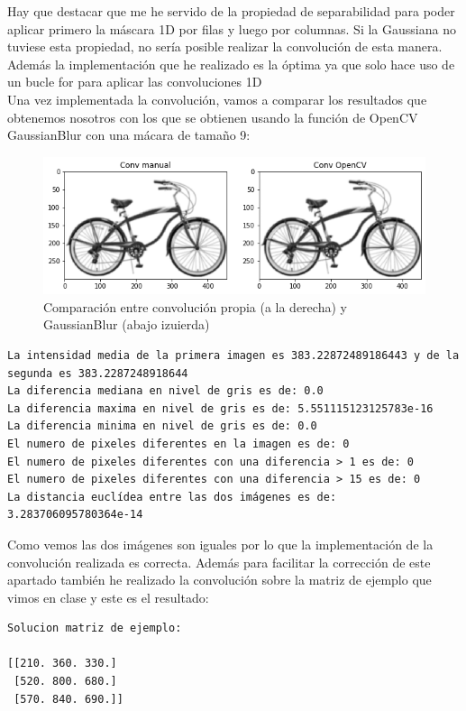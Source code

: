 \documentclass[12pt,spanish]{article}
\begin{document}
Hay que destacar que me he servido de la propiedad de separabilidad  para poder aplicar primero la máscara 1D por filas y luego por columnas. Si la Gaussiana no tuviese esta propiedad, no sería posible realizar la convolución de esta manera. Además la implementación que he realizado es la óptima ya que solo hace uso de un bucle for para aplicar las convoluciones 1D \\

Una vez implementada la convolución, vamos a comparar los resultados que obtenemos nosotros con los que se obtienen usando la función de OpenCV GaussianBlur con una mácara de tamaño 9:

\begin{figure}[H]
	\centering
	\includegraphics[width=\textwidth]{./imagenes_memoria/bicycle_bifuminada.png}
	\caption{Comparación entre convolución propia (a la derecha) y GaussianBlur (abajo izuierda)}
	\label{conv_propia_vs_openCV}
\end{figure}

\begin{lstlisting}[frame=single]
La intensidad media de la primera imagen es 383.22872489186443 y de la segunda es 383.2287248918644
La diferencia mediana en nivel de gris es de: 0.0 
La diferencia maxima en nivel de gris es de: 5.551115123125783e-16 
La diferencia minima en nivel de gris es de: 0.0 
El numero de pixeles diferentes en la imagen es de: 0
El numero de pixeles diferentes con una diferencia > 1 es de: 0
El numero de pixeles diferentes con una diferencia > 15 es de: 0
La distancia euclídea entre las dos imágenes es de:  3.283706095780364e-14
\end{lstlisting}

Como vemos las dos imágenes son iguales por lo que la implementación de la convolución realizada es correcta. Además para facilitar la corrección de este apartado también he realizado la convolución sobre la matriz de ejemplo que vimos en clase y este es el resultado:

\begin{lstlisting}[frame=single]
Solucion matriz de ejemplo: 

[[210. 360. 330.]
 [520. 800. 680.]
 [570. 840. 690.]]
\end{lstlisting}
\end{document}

